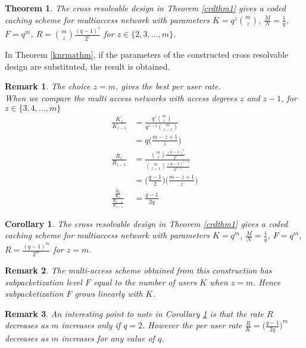 \documentclass[conference]{IEEEtran}
\newtheorem{thm}{Theorem}
\newtheorem{cor}{Corollary}
\newtheorem{rem}{Remark}
\begin{document}
	\begin{thm}
		\label{mathm1}
		The cross resolvable design in Theorem \ref{crdthm1} gives a coded caching scheme for multiaccess network with parameters $K = q^{z} {{m}\choose{z}}$, $\frac{M}{N} = \frac{1}{q}$, $F = q^{m}$, $R = {{m}\choose{z}} \frac{{(q - 1)}^z}{{2}^z}$ for $z \in \{2,3,\dots,m\}$. 
	\end{thm}
	\begin{IEEEproof}
		In 	Theorem \ref{knrmathm}, if the parameters of the constructed cross resolvable design are substituted, the result is obtained.
	\end{IEEEproof}

	\begin{rem}
		The choice $z = m$, gives the best per user rate.\\
		When we compare the multi access networks with access degrees $z$ and $z-1$, for $z \in \{3,4,\dots,m\}$
		\begin{align*}
		\frac{K_z}{K_{z-1}} &=\frac{ q^{z} {{m}\choose{z}}}{q^{z-1} {{m}\choose{z-1}}} \\&= q \Big(\frac{m - z + 1}{z}\Big)\\
		\frac{R_z}{R_{z-1}} &= \frac{{{m}\choose{z}} \frac{{(q - 1)}^z}{{2}^z}}{{{m}\choose{z-1}} \frac{{(q - 1)}^{z-1}}{{2}^{z-1}}} \\&= \Big(\frac{q-1}{2}\Big)\Big(\frac{m - z + 1}{z}\Big) \\
		{\frac{\frac{R_z}{K_z}}{\frac{R_{z-1}}{K_{z-1}}}} &= \frac{q-1}{2q}
		\end{align*}
	\end{rem}
	\begin{cor}
\label{cor1}
		The cross resolvable design in Theorem \ref{crdthm1} gives a coded caching scheme for multiaccess network with parameters $K = q^{m}$, $\frac{M}{N} = \frac{1}{q}$, $F = q^{m}$, $R = \frac{{(q - 1)}^m}{{2}^m}$ for $z = m$.
	\end{cor}
	\begin{rem}
		The multi-access scheme obtained from this construction has subpacketization level $F$ equal to the number of users $K$ when $z=m.$ Hence subpacketization $F$ grows linearly with $K$.
	\end{rem}
	\begin{rem}
		An interesting point to note in Corollary  \ref{cor1} is that the rate $R$ decreases as $m$ increases only if $q = 2$. However the per user rate $\frac{R}{K} = {\big(\frac{q - 1}{2q}\big)}^m$ decreases as $m$ increases for any value of $q$.
	\end{rem}
\end{document}
